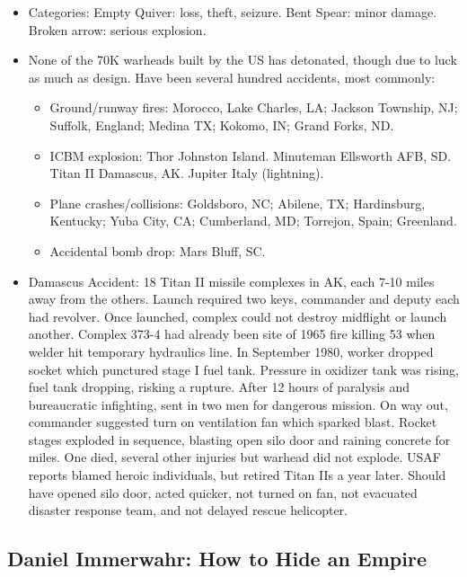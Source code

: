 \documentclass[
]{article}
\begin{document}
\begin{itemize}
\item
  Categories: Empty Quiver: loss, theft, seizure. Bent Spear: minor
  damage. Broken arrow: serious explosion.
\item
  None of the 70K warheads built by the US has detonated, though due to
  luck as much as design. Have been several hundred accidents, most
  commonly:

  \begin{itemize}
  \item
    Ground/runway fires: Morocco, Lake Charles, LA; Jackson Township,
    NJ; Suffolk, England; Medina TX; Kokomo, IN; Grand Forks, ND.
  \item
    ICBM explosion: Thor Johnston Island. Minuteman Ellsworth AFB, SD.
    Titan II Damascus, AK. Jupiter Italy (lightning).
  \item
    Plane crashes/collisions: Goldsboro, NC; Abilene, TX; Hardinsburg,
    Kentucky; Yuba City, CA; Cumberland, MD; Torrejon, Spain; Greenland.
  \item
    Accidental bomb drop: Mars Bluff, SC.
  \end{itemize}
\item
  Damascus Accident: 18 Titan II missile complexes in AK, each 7-10
  miles away from the others. Launch required two keys, commander and
  deputy each had revolver. Once launched, complex could not destroy
  midflight or launch another. Complex 373-4 had already been site of
  1965 fire killing 53 when welder hit temporary hydraulics line. In
  September 1980, worker dropped socket which punctured stage I fuel
  tank. Pressure in oxidizer tank was rising, fuel tank dropping,
  risking a rupture. After 12 hours of paralysis and bureaucratic
  infighting, sent in two men for dangerous mission. On way out,
  commander suggested turn on ventilation fan which sparked blast.
  Rocket stages exploded in sequence, blasting open silo door and
  raining concrete for miles. One died, several other injuries but
  warhead did not explode. USAF reports blamed heroic individuals, but
  retired Titan IIs a year later. Should have opened silo door, acted
  quicker, not turned on fan, not evacuated disaster response team, and
  not delayed rescue helicopter.
\end{itemize}

\hypertarget{daniel-immerwahr-how-to-hide-an-empire}{%
\subsection{Daniel Immerwahr: How to Hide an
Empire}\label{daniel-immerwahr-how-to-hide-an-empire}}
\end{document}
